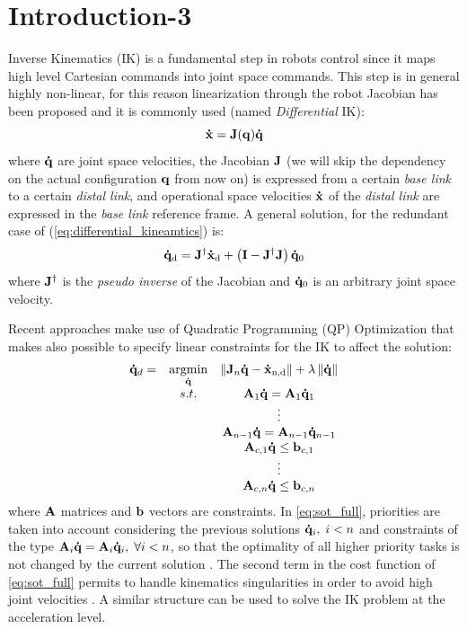 
\section{Introduction-3}
\label{sec:introduction3}
Inverse Kinematics (IK) is a fundamental step in robots control since it maps high level Cartesian commands into joint space commands. This step is in general highly non-linear, for this reason linearization through the robot Jacobian has been proposed and it is commonly used (named \emph{Differential} IK):
\begin{equation}
    \label{eq:differential_kineamtics}
    \mathbf{\dot{x}} = \mathbf{J}(\mathbf{q})\mathbf{\dot{q}}
\end{equation}
where $\mathbf{\dot{q}}$ are joint space velocities, the Jacobian $\mathbf{J}$ (we will skip the dependency on the actual configuration $\mathbf{q}$ from now on) is expressed from a certain \emph{base link} to a certain \emph{distal link}, and operational space velocities $\mathbf{\dot{x}}$ of the \emph{distal link} are expressed in the \emph{base link} reference frame.
A general solution, for the redundant case of (\ref{eq:differential_kineamtics}) is:
\begin{equation}
    \label{eq:differential_inverse_kineamtics}
    \mathbf{\dot{q}}_\text{d} = \mathbf{J}^{\dagger}\mathbf{\dot{x}}_\text{d} + \left( \mathbf{I} - \mathbf{J}^{\dagger}\mathbf{J} \right)\mathbf{\dot{q}}_\text{0}
\end{equation}
where $\mathbf{J}^{\dagger}$ is the \emph{pseudo inverse} of the Jacobian and $\mathbf{\dot{q}}_\text{0}$ is an arbitrary joint space velocity. 

Recent approaches make use of Quadratic Programming (QP) Optimization that makes also possible to specify linear constraints for the IK to affect the solution:
\begin{equation}
\begin{array} {ccc}
    \mathbf{\dot{q}}_d  = & \underset{ \mathbf{\dot{q}} }{ \text{argmin} } & \left\| \mathbf{J}_n \mathbf{\dot{q}} - \mathbf{\dot{x}}_\text{n,d} \right\| + \lambda \left\| \mathbf{\dot{q}} \right\| \\
    & {s.t.} & \mathbf{A}_1 \mathbf{\dot{q}} = \mathbf{A}_1 \mathbf{\dot{q}}_1 \\
    & &  \vdots \\
    & & \mathbf{A}_{n-1} \mathbf{\dot{q}} = \mathbf{A}_{n-1} \mathbf{\dot{q}}_{n-1} \\
    & & \mathbf{A}_{c,1}\mathbf{\dot{q}} \leq \mathbf{b}_{c,1} \\
    & & \vdots \\
    & & \mathbf{A}_{c,n}\mathbf{\dot{q}} \leq \mathbf{b}_{c,n}
\end{array}
\label{eq:sot_full}
\end{equation}
where $\mathbf{A}$ matrices and $\mathbf{b}$ vectors are constraints.
In \eqref{eq:sot_full}, priorities are taken into account considering the previous solutions $\mathbf{\dot{q}}_i, \; i < n$ and constraints of the type {$\mathbf{A}_i \mathbf{\dot{q}} = \mathbf{A}_i \mathbf{\dot{q}}_i, \; \forall i < n$},  so that the optimality of all higher priority tasks is not changed by the current solution \cite{mansard:icar:09}. The second term in the cost function of \eqref{eq:sot_full} permits to handle kinematics singularities in order to avoid high joint velocities \cite{nakamura1990-tp}. A similar structure can be used to solve the IK problem at the acceleration level.

